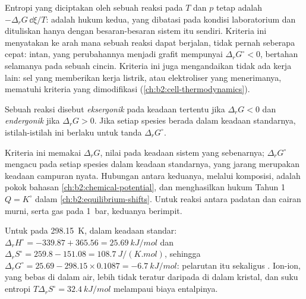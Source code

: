 \begin{remark}\label{rem:b2:reaction-free-energy:criterion}
Entropi yang diciptakan oleh sebuah reaksi pada $T$ dan $p$ tetap adalah
$-\Delta_r G\,
\dd\xi/T$:  adalah hukum kedua, yang dibatasi
pada kondisi laboratorium dan dituliskan hanya dengan besaran-besaran
sistem itu sendiri. Kriteria ini menyatakan ke arah mana sebuah reaksi
dapat berjalan, tidak pernah seberapa cepat: intan, yang perubahannya
menjadi grafit mempunyai $\Delta_r G^\circ < 0$, bertahan selamanya pada
sebuah cincin. Kriteria ini juga mengandaikan tidak ada kerja lain: sel
yang memberikan kerja listrik, atau elektroliser yang menerimanya,
mematuhi kriteria yang dimodifikasi (\cref{ch:b2:cell-thermodynamics}).
\end{remark}

\begin{definition}\label{def:b2:reaction-free-energy:exergonic}
Sebuah reaksi disebut \emph{eksergonik} pada keadaan
tertentu jika $\Delta_r G < 0$ dan \emph{endergonik}
jika $\Delta_r G >
0$. Jika setiap spesies berada dalam keadaan
standarnya, istilah-istilah ini berlaku untuk tanda $\Delta_r G^\circ$.
\end{definition}

Kriteria ini memakai $\Delta_r G$, nilai pada keadaan sistem yang
sebenarnya; $\Delta_r G^\circ$ mengacu pada setiap spesies dalam keadaan
standarnya, yang jarang merupakan keadaan campuran nyata. Hubungan antara
keduanya, melalui komposisi, adalah pokok bahasan
\cref{ch:b2:chemical-potential}, dan menghasilkan hukum Tahun 1
$Q = K^\circ$ dalam \cref{ch:b2:equilibrium-shifts}. Untuk reaksi antara
padatan dan cairan murni, serta gas pada \qty{1}{bar}, keduanya
berimpit.

\begin{example}\label{ex:b2:reaction-free-energy:cold-pack}
Untuk  pada \qty{298.15}{K}, dalam
keadaan standar: $\Delta_r H^\circ = -339.87 + 365.56 = \qty{+25.69}{kJ/mol}$
dan $\Delta_r S^\circ = 259.8 - 151.08 = \qty{+108.7}{J/(K.mol)}$, sehingga
$\Delta_r G^\circ = 25.69 - 298.15 \times 0.1087 = \qty{-6.7}{kJ/mol}$:
pelarutan itu  sekaligus . Ion-ion, yang bebas di dalam
air, lebih tidak teratur daripada di dalam kristal, dan suku entropi
$T\Delta_r
S^\circ = \qty{32.4}{kJ/mol}$ melampaui biaya entalpinya.
\end{example}

